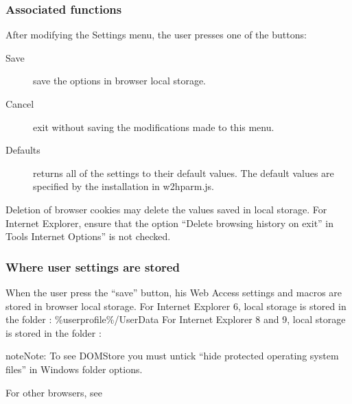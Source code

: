 \documentclass[letterpaper,10pt,english]{sphinxmanual}
\begin{document}
\subsubsection{Associated functions}
\label{\detokenize{User_Guide:id5}}
After modifying the Settings menu, the user presses one of the buttons:
\begin{description}
\item[{Save}] \leavevmode
save the options in browser local storage.

\item[{Cancel}] \leavevmode
exit without saving the modifications made to this menu.

\item[{Defaults}] \leavevmode
returns all of the settings to their default values. The default values are specified by the installation in w2hparm.js.

\end{description}

Deletion of browser cookies may delete the values saved in local storage. For Internet Explorer, ensure that the option “Delete browsing history on exit” in Tools \textendash{} Internet Options” is not checked.


\subsubsection{Where user settings are stored}
\label{\detokenize{User_Guide:where-user-settings-are-stored}}
When the user press the “save” button, his Web Access settings and macros are stored in browser local storage. For Internet Explorer 6, local storage is stored in the folder :
\%userprofile\%/UserData For Internet Explorer 8 and 9, local storage is stored in the folder :

\begin{sphinxVerbatim}[commandchars=\\\{\}]
   
\end{sphinxVerbatim}

\begin{sphinxadmonition}{note}{Note:}
To see DOMStore you must untick “hide protected operating system files” in Windows folder options.
\end{sphinxadmonition}

For other browsers, see
\end{document}
